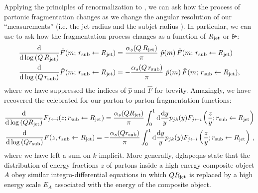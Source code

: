 


Applying the principles of renormalization to , we can ask how the process of partonic fragmentation changes as we change the angular resolution of our ``measurements'' (i.e. the jet radius \Rjet{} and the subjet radius \rsub{}).
%
In particular, we can use  to ask how the fragmentation process changes as a function of \(R_\text{jet}\) or \(\rsub\):
\begin{subequations}
\begin{align}
    \label{eq:fragmentation_dglap_upper}
    \frac{\dd}{\dd\log\le(Q\,\Rjet\ri)} \hat{F}(m;\,\rsub\leftarrow \Rjet)
    &=
    \frac{\alpha_s(Q\,\Rjet)}{\pi}
    \,\,
    \hat{p}(m)
    \,
    \hat{F}(m;\,\rsub\leftarrow \Rjet)
    \\
    \label{eq:fragmentation_dglap_lower}
    \frac{\dd}{\dd\log\le(Q\,\rsub\ri)} \hat{F}(m;\,\rsub\leftarrow \Rjet)
    &=
    -\frac{\alpha_s(Q\,\rsub)}{\pi}
    \,\,
    \hat{p}(m)
    \,
    \hat{F}(m;\,\rsub\leftarrow \Rjet)
    ,
\end{align}
\end{subequations}
where we have suppressed the indices of \(\hat{p}\) and \(\hat{F}\) for brevity.
%
Amazingly, we have recovered the celebrated  \cite{Gribov:1972ri,Dokshitzer:1977sg,Altarelli:1977zs} for our parton-to-parton fragmentation functions:
\begin{align}
    \frac{\dd}{\dd\log\left(Q R_\text{jet}\right)}
    F_{f\leftarrow i}(z; r_\text{sub} \leftarrow R_\text{jet})
    =
    \frac{\alpha_s(QR_\text{jet})}{\pi}
    \int_0^1
    \dd \frac{\dd y}{y}
    p_{j k}(y)
    F_{j\leftarrow i}\left(\frac{z}{y}; r_\text{sub} \leftarrow R_\text{jet}\right)
    \\
    \frac{\dd}{\dd\log\left(Q r_\text{sub}\right)}
    F(z, r_\text{sub} \leftarrow R_\text{jet})
    =
    -
    \frac{\alpha_s(Qr_\text{sub})}{\pi}
    \int_0^1
    \dd \frac{\dd y}{y}
    p_{j k}(y)
    F_{j\leftarrow i}\left(\frac{z}{y}; r_\text{sub} \leftarrow R_\text{jet}\right)
    \,,
\end{align}
where we have left a sum on \(k\) implicit.
%
More generally, \glspl{dglapeqn} state that the distribution of energy fractions \(z\) of partons inside a high energy composite object \(A\) obey similar integro-differential equations in which \(QR_\text{jet}\) is replaced by a high energy scale \(E_A\) associated with the energy of the composite object.


